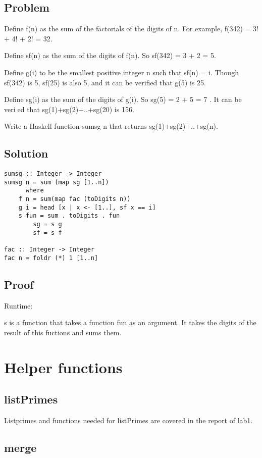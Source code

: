 \documentclass[a4paper,11pt]{article}
\begin{document}
\subsection{Problem}

Define f(n) as the sum of the factorials of the digits of n. For example, f(342) = 3!  + 4!  + 2!  = 32.

Define sf(n) as the sum of the digits of f(n). So sf(342) = 3 + 2 = 5.

Define g(i) to be the smallest positive integer n such that sf(n) = i. Though sf(342) is 5, sf(25)
is also 5,  and it can be verified that g(5) is 25.

Define sg(i) as  the  sum  of  the  digits  of g(i).   So sg(5) = 2 + 5 = 7 . It  can  be  veried  that sg(1)+sg(2)+..+sg(20) is 156.

Write a Haskell function sumsg n that returns sg(1)+sg(2)+..+sg(n).
\subsection{Solution}

\begin{lstlisting}
sumsg :: Integer -> Integer
sumsg n = sum (map sg [1..n])
      where
	f n = sum(map fac (toDigits n))
	g i = head [x | x <- [1..], sf x == i]
	s fun = sum . toDigits . fun
      	sg = s g
      	sf = s f

fac :: Integer -> Integer
fac n = foldr (*) 1 [1..n]
\end{lstlisting}

\subsection{Proof}
Runtime:

s is a function that takes a function fun as an argument. It takes the digits of the result of this fuctions and sums them.

\section{Helper functions}

\subsection{listPrimes}
Listprimes and functions needed for listPrimes are covered in the report of lab1.

\subsection{merge}
\end{document}
